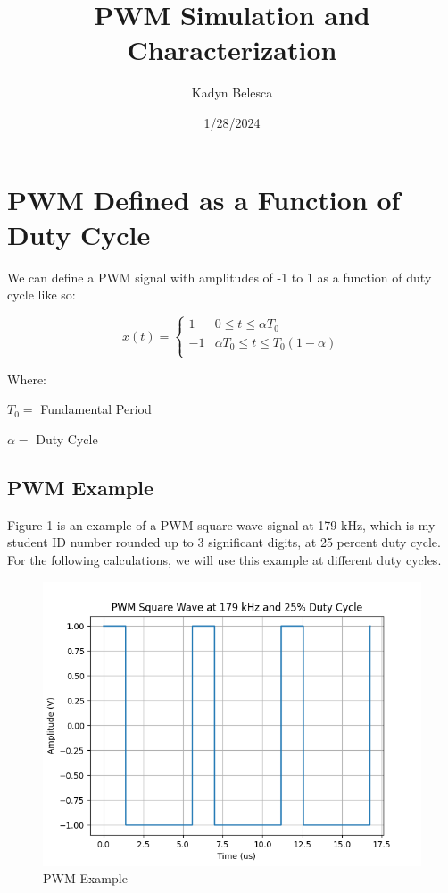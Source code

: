 \documentclass{article}
\title{PWM Simulation and Characterization}
\author{Kadyn Belesca}
\date{1/28/2024}
\begin{document}
\maketitle

\newpage

\section{PWM Defined as a Function of Duty Cycle}

We can define a PWM signal with amplitudes of -1 to 1 as a function of duty cycle like so:

\begin{equation}
x(t) =
    \begin{cases}
    1 & 0 \leq t \leq \alpha{T_{0}} \\
    -1 & \alpha{T_{0}} \leq t \leq T_{0}(1 - \alpha) \\ 
    \end{cases}
\end{equation}

Where:

\vspace{5mm}

$T_{0} =$ Fundamental Period

$\alpha =$ Duty Cycle

\subsection{PWM Example}
Figure 1 is an example of a PWM square wave signal at 179 kHz, which is my student ID number rounded up to 3 significant digits,
at 25 percent duty cycle. For the following calculations, we will use this example at different duty cycles.
\begin{figure}[h]
\includegraphics[scale=.70]{squarewave.png}
\caption{PWM Example}
\end{figure}
\end{document}

